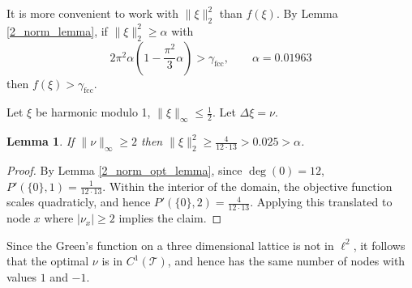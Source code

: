 \documentclass[a4paper, 12pt, notitlepage]{amsart}
\newcommand{\fcc}{\operatorname{fcc}}
\newcommand{\sT}{\mathscr{T}}
\newtheorem{lemma}[theorem]{Lemma}
\theoremstyle{remark}
\begin{document}
It is more convenient to work with $\|\xi\|_2^2$ than $f(\xi)$.  By Lemma \ref{2_norm_lemma}, if $\|\xi\|_2^2 \geq \alpha$ with \begin{equation} 2\pi^2 \alpha\left(1 -\frac{\pi^2}{3}\alpha\right) > \gamma_{\fcc}, \qquad  \alpha = 0.01963\end{equation} then $f(\xi) >\gamma_{\fcc}$.

 Let $\xi$ be harmonic modulo 1, $\|\xi\|_\infty \leq \frac{1}{2}$. Let $\Delta \xi = \nu$. 
 \begin{lemma}
  If $\|\nu\|_{\infty} \geq 2$ then $\|\xi\|_2^2 \geq \frac{4}{12 \cdot 13} > 0.025 > \alpha$.
 \end{lemma}
\begin{proof}
 By Lemma \ref{2_norm_opt_lemma}, since $\deg(0) = 12$, $P'(\{0\}, 1) = \frac{1}{12 \cdot 13}$.  Within the interior of the domain, the objective function scales quadraticly, and hence $P'(\{0\}, 2) = \frac{4}{12 \cdot 13}$. Applying this translated to node $x$ where $|\nu_x| \geq 2$ implies the claim.
\end{proof}


Since the Green's function on a three dimensional lattice is not in $\ell^2$, it follows that the optimal $\nu$ is in $C^1(\sT)$, and hence has the same number of nodes with values $1$ and $-1$. 
\end{document}
